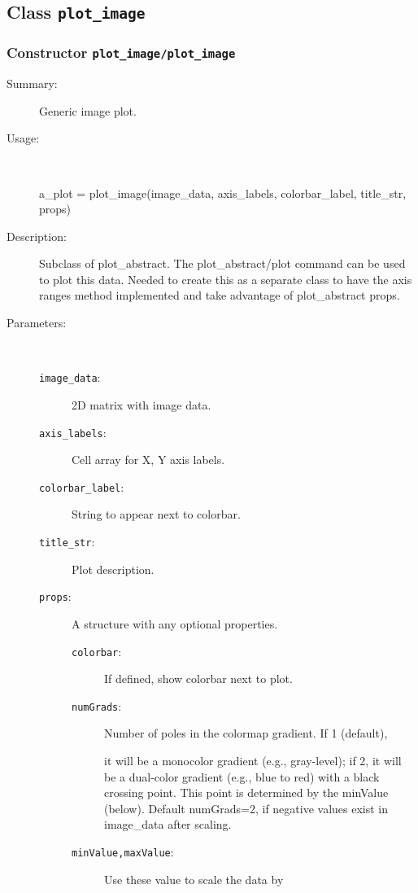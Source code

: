 \subsection{Class \texttt{plot\_image}}%
%
\label{ref_plot_image}%
\hypertarget{ref_plot_image}{}%
\subsubsection[Constructor \texttt{plot\_image}]{Constructor \texttt{plot\_image/plot\_image}}%
%
\label{ref_plot_image__plot_image}%
\hypertarget{ref_plot_image__plot_image}{}%
\begin{description}
\item[Summary:]Generic image plot.
%
\item[Usage:]~%
\begin{lyxcode}%
a\_plot = plot\_image(image\_data, axis\_labels, colorbar\_label, title\_str, props)
%
\end{lyxcode}%
%
\item[Description:]%
Subclass of plot\_abstract. The plot\_abstract/plot command can be used to
 plot this data. Needed to create this as a separate class to have the
 axis ranges method implemented and take advantage of plot\_abstract props.
\item[Parameters:]~
\begin{description}%
\item[\texttt{image\_data}:]
 2D matrix with image data.
\item[\texttt{axis\_labels}:]
 Cell array for X, Y axis labels.
\item[\texttt{colorbar\_label}:]
 String to appear next to colorbar.
\item[\texttt{title\_str}:]
 Plot description.
\item[\texttt{props}:]
 A structure with any optional properties.
\begin{description}%
\item[\texttt{colorbar}:]
 If defined, show colorbar next to plot.
\item[\texttt{numGrads}:]
 Number of poles in the colormap gradient. If 1 (default),

it will be a monocolor gradient (e.g., gray-level); if 2, it will
be a dual-color gradient (e.g., blue to red) with a black
crossing point. This point is determined by the minValue
(below). Default numGrads=2, if negative values exist in
image\_data after scaling.
\item[\texttt{minValue,maxValue}:]
 Use these value to scale the data by 


\end{description}
\end{description}
\end{description}

